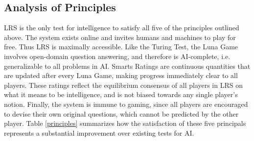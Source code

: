 \subsection{Analysis of Principles}

LRS is the only test for intelligence to satisfy all five of the principles outlined above. The system exists online and invites humans and machines to play for free. Thus LRS is maximally accessible. Like the Turing Test, the Luna Game involves open-domain question answering, and therefore is AI-complete, i.e. generalizable to all problems in AI. Smarts Ratings are continuous quantities that are updated after every Luna Game, making progress immediately clear to all players. These ratings reflect the equilibrium consensus of all players in LRS on what it means to be intelligence, and is not biased towards any single player's notion. Finally, the system is immune to gaming, since all players are encouraged to devise their own original questions, which cannot be predicted by the other player. Table \ref{principles} summarizes how the satisfaction of these five principals represents a substantial improvement over existing tests for AI.

